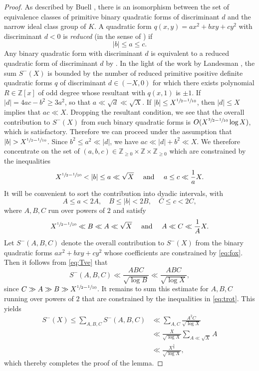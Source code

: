 \documentclass[11pt]{article}
\newcommand{\ZZ}{\mathbb{Z}}\let\Z\ZZ
\numberwithin{equation}{section}
\begin{document}
\begin{proof}
As described by Buell \cite[Prop.\,6.20]{Buell},
there is an isomorphism between the set of equivalence classes of primitive binary quadratic forms of discriminant $d$ and the narrow ideal class group of $K$. A quadratic form $q(x,y)=ax^2+bxy+cy^2$ with discriminant $d<0$ is \emph{reduced} (in the sense of \cite[Eq.\,(2.1)]{Buell}) if
\[
|b|\leq a\leq c.
\]
Any binary quadratic form with
discriminant $d$ is equivalent to a reduced quadratic form of
discriminant $d$ by \cite[Th.\,2.3]{Buell}.
In the light of the work by Landesman \cite[Th.\,1.1]{aaron}, the sum
$S^-(X)$ is bounded by the number of
reduced primitive positive definite quadratic forms $q$ of discriminant $d\in (-X,0)$ for which
there exists
polynomial $R\in \ZZ[x]$ of odd degree whose resultant with $q(x,1)$ is $\pm 1$.
If $|d|=4ac-b^2\geq 3a^2$, so that
$a\ll \sqrt{d}\ll \sqrt{X}$.
If $|b|\leq X^{\sfrac{1}{2}-\sfrac{1}{10}}$, then
$|d|\leq X$ implies that $ac\ll X$.
Dropping the resultant condition, we see that the overall contribution to $S^-(X)$ from
such binary quadratic forms
is $O(X^{\sfrac{3}{2}-\sfrac{1}{10}}\log X)$, which is satisfactory.
Therefore we can proceed under the assumption that $|b|>X^{\sfrac{1}{2}-\sfrac{1}{10}}$.
Since $b^2\leq a^2\ll |d|$, we have $ac\ll|d|+b^2\ll X$.
We therefore concentrate on the set of $(a,b,c)\in \Z_{\geq 0}\times \Z\times \Z_{\geq 0}$ which are constrained by the inequalities
\[
X^{\sfrac{1}{2}-\sfrac{1}{10}}<|b|\leq a\ll \sqrt{X}\quad \text{ and }\quad a\leq c\ll \frac{1}{a}X.
\]
It will be convenient to sort the contribution into dyadic intervals, with
\begin{equation}\label{eq:fox}
A\leq a<2A,\quad B\leq |b|<2B,\quad C\leq c<2C,
\end{equation}
where $A,B,C$ run over powers of $2$ and satisfy
\begin{equation}\label{eq:trot}
X^{\sfrac{1}{2}-\sfrac{1}{10}}\ll B\ll A\ll\sqrt{X}\quad \text{ and }\quad A\ll C\ll \frac{1}{A}X.
\end{equation}
Let $S^-(A,B,C)$ denote the overall contribution to $S^-(X)$ from the binary quadratic forms
$ax^2+bxy+cy^2$ whose coefficients are constrained by \eqref{eq:fox}.
Then it follows from \eqref{eq:Tve}
that
\[
S^-(A,B,C)\ll \frac{ABC}{\sqrt{\log B}}\ll
\frac{ABC}{\sqrt{\log X}},
\]
since $C\gg A\gg B\gg X^{\sfrac{1}{2}-\sfrac{1}{10}}$.
It remains to sum this estimate for
$A,B,C$ running over powers of $2$ that are constrained by the
inequalities in \eqref{eq:trot}. This yields
\begin{align*}
S^-(X)\leq \sum_{A,B,C} S^-(A,B,C)
&\ll \sum_{A,C}
\frac{A^2C}{\sqrt{\log X}}\\
&\ll \frac{X}{\sqrt{\log X}}
\sum_{A\ll \sqrt{X}}
A\\
&\ll \frac{X^{\frac{3}{2}}}{\sqrt{\log X}},
\end{align*}
which thereby completes the proof of the lemma.
\end{proof}
\end{document}
